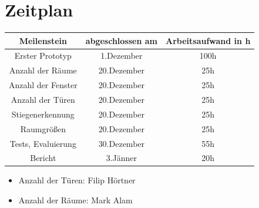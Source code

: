 \documentclass[deutsch]{scrartcl}
\begin{document}
\section{Zeitplan}
\begin{table}[h!]
	\centering
		\begin{tabular}{|c|c|c|}
		\hline
		Meilenstein & abgeschlossen am & Arbeitsaufwand in h\\
		\hline
		Erster Prototyp & 1.Dezember & 100h\\
		Anzahl der Räume & 20.Dezember & 25h\\
		Anzahl der Fenster & 20.Dezember & 25h\\
		Anzahl der Türen & 20.Dezember & 25h\\
		Stiegenerkennung & 20.Dezember & 25h\\
		Raumgrößen & 20.Dezember & 25h\\
		Tests, Evaluierung & 30.Dezember & 55h\\
		Bericht & 3.Jänner & 20h\\
		\hline
		\end{tabular}
\end{table}
\begin{itemize}
	\item Anzahl der Türen: Filip Hörtner \cite{TUW-274401}
	\item Anzahl der Räume: Mark Alam \cite{vargas18}

	
\end{itemize}


\end{document}
